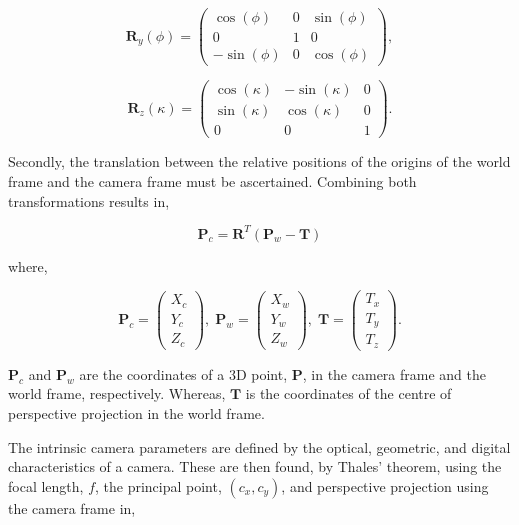 \documentclass[journal]{IEEEtran}
\begin{document}
\begin{equation}
\pmb{R}_{y}(\phi) = 
\begin{pmatrix} \cos(\phi) & 0 & \sin(\phi) \\ 0 & 1 & 0 \\ -\sin(\phi) & 0 & \cos(\phi) \end{pmatrix},
\label{rotmat2}
\end{equation}

\begin{equation}
\pmb{R}_{z}(\kappa) = 
\begin{pmatrix} \cos(\kappa) & -\sin(\kappa) & 0 \\ \sin(\kappa) & \cos(\kappa) & 0 \\ 0 & 0 & 1 \end{pmatrix}.
\label{rotmat3}
\end{equation}




Secondly, the translation between the relative positions of the origins of the world frame and the camera frame must be ascertained. Combining both transformations results in,


\begin{equation}
\pmb{P}_{c} = \pmb{R}^T(\pmb{P}_{w} - \pmb{T})
\label{rotmatcondensed}
\end{equation}

where,

\begin{equation}
\pmb{P}_{c} =
\begin{pmatrix} X_{c} \\ Y_{c} \\ Z_{c} \end{pmatrix} 
, \;
\pmb{P}_{w} = 
\begin{pmatrix} X_{w} \\ Y_{w}\\ Z_{w} \end{pmatrix} 
, \;
\pmb{T} = 
\begin{pmatrix} T_{x} \\ T_{y}\\ T_{z} \end{pmatrix}.
\label{rotmatmeaning}
\end{equation}


$\pmb{P}_{c}$ and $\pmb{P}_{w}$ are the coordinates of a 3D point, $\pmb{P}$, in the camera frame and the world frame, respectively. Whereas, $\pmb{T}$ is the coordinates of the centre of perspective projection in the world frame.

The intrinsic camera parameters are defined by the optical, geometric, and digital characteristics of a camera. These are then found, by Thales' theorem, using the focal length, $f$, the principal point, $(c_{x}, c_{y})$, and perspective projection using the camera frame in,
\end{document}
